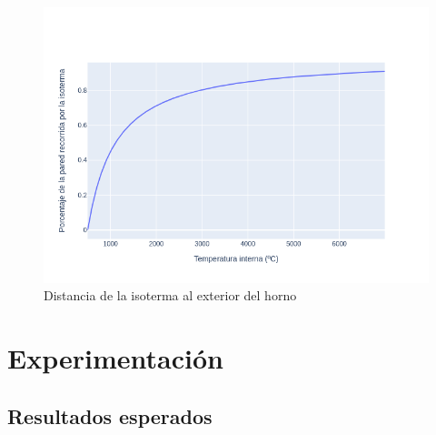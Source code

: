 \documentclass[12pt]{article}
\begin{document}
\begin{figure}[H]
  \centering
  \includegraphics[scale=0.5]{isotherm_by_inner}
  \caption{Distancia de la isoterma al exterior del horno}
  \label{fig:isotherm_by_inner}
\end{figure}

\section{Experimentación} 


\subsection{Resultados esperados}
\label{sec:expected}
\end{document}
